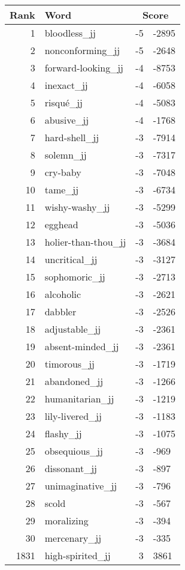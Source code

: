 \begin{longtable}[!htbp]{| rlr@{.}l |}
    \hline
    \textbf{Rank} & \textbf{Word} & \multicolumn{2}{c|}{\textbf{Score}} \\
    \hline
    \endhead
    1 & bloodless\_jj & -5 & -2895 \\
    2 & nonconforming\_jj & -5 & -2648 \\
    3 & forward-looking\_jj & -4 & -8753 \\
    4 & inexact\_jj & -4 & -6058 \\
    5 & risqué\_jj & -4 & -5083 \\
    6 & abusive\_jj & -4 & -1768 \\
    7 & hard-shell\_jj & -3 & -7914 \\
    8 & solemn\_jj & -3 & -7317 \\
    9 & cry-baby & -3 & -7048 \\
    10 & tame\_jj & -3 & -6734 \\
    11 & wishy-washy\_jj & -3 & -5299 \\
    12 & egghead & -3 & -5036 \\
    13 & holier-than-thou\_jj & -3 & -3684 \\
    14 & uncritical\_jj & -3 & -3127 \\
    15 & sophomoric\_jj & -3 & -2713 \\
    16 & alcoholic & -3 & -2621 \\
    17 & dabbler & -3 & -2526 \\
    18 & adjustable\_jj & -3 & -2361 \\
    19 & absent-minded\_jj & -3 & -2361 \\
    20 & timorous\_jj & -3 & -1719 \\
    21 & abandoned\_jj & -3 & -1266 \\
    22 & humanitarian\_jj & -3 & -1219 \\
    23 & lily-livered\_jj & -3 & -1183 \\
    24 & flashy\_jj & -3 & -1075 \\
    25 & obsequious\_jj & -3 & -969 \\
    26 & dissonant\_jj & -3 & -897 \\
    27 & unimaginative\_jj & -3 & -796 \\
    28 & scold & -3 & -567 \\
    29 & moralizing & -3 & -394 \\
    30 & mercenary\_jj & -3 & -335 \\
    1831 & high-spirited\_jj & 3 & 3861 \\

\end{longtable}
